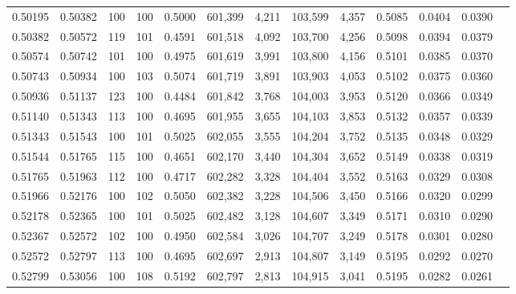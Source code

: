 \begin{tabular}{rrrrrrrrrrrrr}
0.50195 & 0.50382 &   100 & 100 &                                     0.5000 & 601,399 &   4,211 & 103,599 &   4,357 & 0.5085 & 0.0404 & 0.0390 \\
0.50382 & 0.50572 &   119 & 101 &                                     0.4591 & 601,518 &   4,092 & 103,700 &   4,256 & 0.5098 & 0.0394 & 0.0379 \\
0.50574 & 0.50742 &   101 & 100 &                                     0.4975 & 601,619 &   3,991 & 103,800 &   4,156 & 0.5101 & 0.0385 & 0.0370 \\
0.50743 & 0.50934 &   100 & 103 &                                     0.5074 & 601,719 &   3,891 & 103,903 &   4,053 & 0.5102 & 0.0375 & 0.0360 \\
0.50936 & 0.51137 &   123 & 100 &                                     0.4484 & 601,842 &   3,768 & 104,003 &   3,953 & 0.5120 & 0.0366 & 0.0349 \\
0.51140 & 0.51343 &   113 & 100 &                                     0.4695 & 601,955 &   3,655 & 104,103 &   3,853 & 0.5132 & 0.0357 & 0.0339 \\
0.51343 & 0.51543 &   100 & 101 &                                     0.5025 & 602,055 &   3,555 & 104,204 &   3,752 & 0.5135 & 0.0348 & 0.0329 \\
0.51544 & 0.51765 &   115 & 100 &                                     0.4651 & 602,170 &   3,440 & 104,304 &   3,652 & 0.5149 & 0.0338 & 0.0319 \\
0.51765 & 0.51963 &   112 & 100 &                                     0.4717 & 602,282 &   3,328 & 104,404 &   3,552 & 0.5163 & 0.0329 & 0.0308 \\
0.51966 & 0.52176 &   100 & 102 &                                     0.5050 & 602,382 &   3,228 & 104,506 &   3,450 & 0.5166 & 0.0320 & 0.0299 \\
0.52178 & 0.52365 &   100 & 101 &                                     0.5025 & 602,482 &   3,128 & 104,607 &   3,349 & 0.5171 & 0.0310 & 0.0290 \\
0.52367 & 0.52572 &   102 & 100 &                                     0.4950 & 602,584 &   3,026 & 104,707 &   3,249 & 0.5178 & 0.0301 & 0.0280 \\
0.52572 & 0.52797 &   113 & 100 &                                     0.4695 & 602,697 &   2,913 & 104,807 &   3,149 & 0.5195 & 0.0292 & 0.0270 \\
0.52799 & 0.53056 &   100 & 108 &                                     0.5192 & 602,797 &   2,813 & 104,915 &   3,041 & 0.5195 & 0.0282 & 0.0261 \\

\end{tabular}
